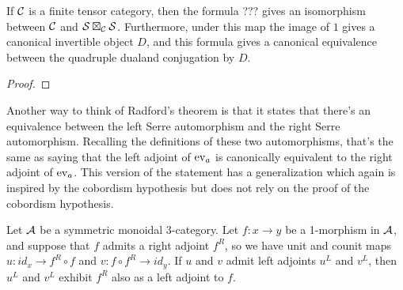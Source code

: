 \documentclass{amsart}
\begin{document}
\begin{theorem}
If $\mathcal C$ is a finite tensor category, then the formula ??? gives an isomorphism between $\mathcal C$ and $\mathcal S \boxtimes_\mathcal C \mathcal S$.  Furthermore, under this map the image of $1$ gives a canonical invertible object $D$, and this formula gives a canonical equivalence between the  quadruple dualand conjugation by $D$.
\end{theorem}
\begin{proof}
\end{proof}

Another way to think of Radford's theorem is that it states that there's an equivalence between the left Serre automorphism and the right Serre automorphism.  Recalling the definitions of these two automorphisms, that's the same as saying that the left adjoint of $\mathrm{ev}_a$ is canonically equivalent to the right adjoint of $\mathrm{ev}_a$.  This version of the statement has a generalization which again is inspired by the cobordism hypothesis but does not rely on the proof of the cobordism hypothesis.


\begin{proposition} \label{prop-ambiadjoints}
	Let $\mathcal A$ be a symmetric monoidal 3-category. Let $f: x \to y$ be a 1-morphism in $\mathcal A$, and suppose that $f$ admits a right adjoint $f^R$,  so we have unit and counit maps $u:id_x \to f^R \circ f$ and $v:f \circ f^R \to id_y$. If $u$ and $v$ admit left adjoints $u^L$ and $v^L$, then $u^L$ and $v^L$ exhibit $f^R$ also as a left adjoint to $f$. 
\end{proposition}
\end{document}
